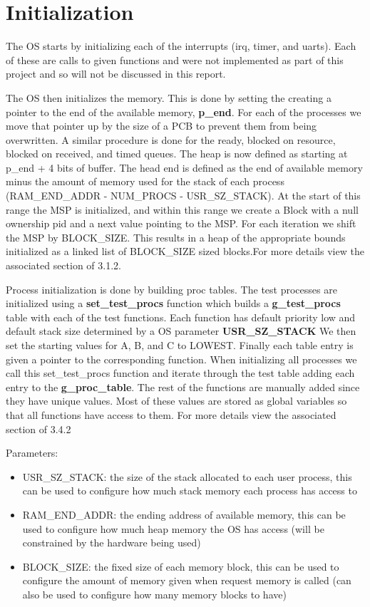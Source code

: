 \documentclass[11pt, oneside]{article}
\begin{document}
\section{Initialization}
The OS starts by initializing each of the interrupts (irq, timer, and uarts). Each of these are calls to given functions and were not implemented as part of this project and so will not be discussed in this report.

The OS then initializes the memory. This is done by setting the creating a pointer to the end of the available memory, \textbf{p\_end}. For each of the processes we move that pointer up by the size of a PCB to prevent them from being overwritten. A similar procedure is done for the ready, blocked on resource, blocked on received, and timed queues. The heap is now defined as starting at p\_end + 4 bits of buffer. The head end is defined as the end of available memory minus the amount of memory used for the stack of each process (RAM\_END\_ADDR - NUM\_PROCS - USR\_SZ\_STACK). At the start of this range the MSP is initialized, and within this range we create a Block with a null ownership pid and a next value pointing to the MSP. For each iteration we shift the MSP by BLOCK\_SIZE. This results in a heap of the appropriate bounds initialized as a linked list of BLOCK\_SIZE sized blocks.For more details view the associated section of 3.1.2.

Process initialization is done by building proc tables. The test processes are initialized using a \textbf{set\_test\_procs} function which builds a \textbf{g\_test\_procs} table with each of the test functions. Each function has default priority low and default stack size determined by a OS parameter \textbf{USR\_SZ\_STACK} We then set the starting values for A, B, and C to LOWEST. Finally each table entry is given a pointer to the corresponding function. When initializing all processes we call this set\_test\_procs function and iterate through the test table adding each entry to the \textbf{g\_proc\_table}. The rest of the functions are manually added since they have unique values. Most of these values are stored as global variables so that all functions have access to them. For more details view the associated section of 3.4.2

Parameters:
\begin{itemize}
    \item USR\_SZ\_STACK: the size of the stack allocated to each user process, this can be used to configure how much stack memory each process has access to
    \item RAM\_END\_ADDR: the ending address of available memory, this can be used to configure how much heap memory the OS has access (will be constrained by the hardware being used)
    \item BLOCK\_SIZE: the fixed size of each memory block, this can be used to configure the amount of memory given when request memory is called (can also be used to configure how many memory blocks to have)
\end{itemize}
\end{document}
